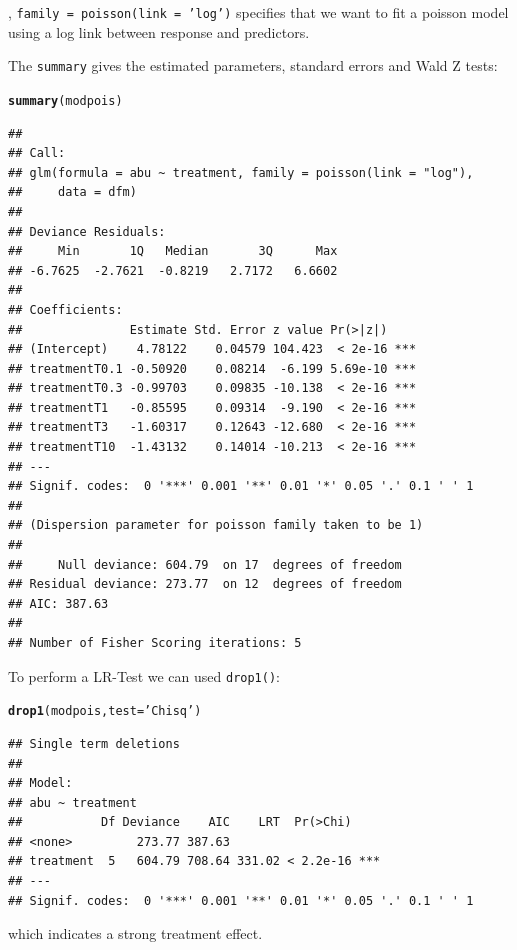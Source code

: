 \documentclass{scrartcl}\usepackage[]{graphicx}\usepackage[]{color}
\makeatletter
\newcommand{\hlstr}[1]{\textcolor[rgb]{0.192,0.494,0.8}{#1}}%
\newcommand{\hlstd}[1]{\textcolor[rgb]{0.345,0.345,0.345}{#1}}%
\newcommand{\hlkwc}[1]{\textcolor[rgb]{0.333,0.667,0.333}{#1}}%
\newcommand{\hlkwd}[1]{\textcolor[rgb]{0.737,0.353,0.396}{\textbf{#1}}}%
\newenvironment{kframe}{%
 \def\at@end@of@kframe{}%
 \ifinner\ifhmode%
  \def\at@end@of@kframe{\end{minipage}}%
  \begin{minipage}{\columnwidth}%
 \fi\fi%
 \def\FrameCommand##1{\hskip\@totalleftmargin \hskip-\fboxsep
 \colorbox{shadecolor}{##1}\hskip-\fboxsep
     \hskip-\linewidth \hskip-\@totalleftmargin \hskip\columnwidth}%
 \MakeFramed {\advance\hsize-\width
   \@totalleftmargin\z@ \linewidth\hsize
   \@setminipage}}%
 {\par\unskip\endMakeFramed%
 \at@end@of@kframe}
\newenvironment{knitrout}{}{} %
\makeatother
\begin{document}
, \texttt{family = poisson(link = 'log')} specifies that we want to fit a poisson model using a log link between response and predictors.

The \texttt{summary} gives the estimated parameters, standard errors and Wald Z tests:
\begin{knitrout}
\color{fgcolor}\begin{kframe}
\begin{alltt}
\hlkwd{summary}\hlstd{(modpois)}
\end{alltt}
\begin{verbatim}
## 
## Call:
## glm(formula = abu ~ treatment, family = poisson(link = "log"), 
##     data = dfm)
## 
## Deviance Residuals: 
##     Min       1Q   Median       3Q      Max  
## -6.7625  -2.7621  -0.8219   2.7172   6.6602  
## 
## Coefficients:
##               Estimate Std. Error z value Pr(>|z|)    
## (Intercept)    4.78122    0.04579 104.423  < 2e-16 ***
## treatmentT0.1 -0.50920    0.08214  -6.199 5.69e-10 ***
## treatmentT0.3 -0.99703    0.09835 -10.138  < 2e-16 ***
## treatmentT1   -0.85595    0.09314  -9.190  < 2e-16 ***
## treatmentT3   -1.60317    0.12643 -12.680  < 2e-16 ***
## treatmentT10  -1.43132    0.14014 -10.213  < 2e-16 ***
## ---
## Signif. codes:  0 '***' 0.001 '**' 0.01 '*' 0.05 '.' 0.1 ' ' 1
## 
## (Dispersion parameter for poisson family taken to be 1)
## 
##     Null deviance: 604.79  on 17  degrees of freedom
## Residual deviance: 273.77  on 12  degrees of freedom
## AIC: 387.63
## 
## Number of Fisher Scoring iterations: 5
\end{verbatim}
\end{kframe}
\end{knitrout}

To perform a LR-Test we can used \texttt{drop1()}:
\begin{knitrout}
\color{fgcolor}\begin{kframe}
\begin{alltt}
\hlkwd{drop1}\hlstd{(modpois,} \hlkwc{test} \hlstd{=} \hlstr{'Chisq'}\hlstd{)}
\end{alltt}
\begin{verbatim}
## Single term deletions
## 
## Model:
## abu ~ treatment
##           Df Deviance    AIC    LRT  Pr(>Chi)    
## <none>         273.77 387.63                     
## treatment  5   604.79 708.64 331.02 < 2.2e-16 ***
## ---
## Signif. codes:  0 '***' 0.001 '**' 0.01 '*' 0.05 '.' 0.1 ' ' 1
\end{verbatim}
\end{kframe}
\end{knitrout}
which indicates a strong treatment effect.
\end{document}

